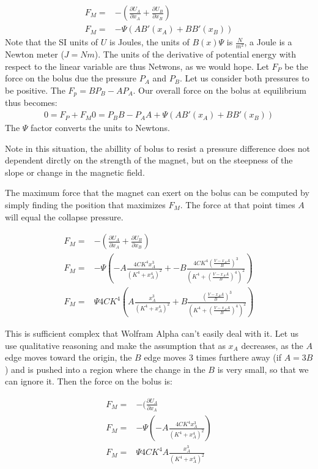 \documentclass{asme2ej}
\begin{document}
\begin{align}
  F_M = & - (\frac{\partial U_A}{\partial x_A} +  \frac{\partial U_B}{\partial x_B}) \\
  F_M =&  - \Psi ( A B'(x_A) + B B'(x_B))
  \label{eq:magforce}
\end{align}
Note that the SI units of $U$ is Joules, the units of $ B(x) \Psi$ is $\frac{N}{m^2}$,
a Joule is a Newton meter ($J = N m$).
The units of the derivative of potential energy with respect to the linear variable are
thus Netwons, as we would hope. Let $F_P$ be the force on the bolus due the pressure $P_A$ and $P_B$.
Let us consider both pressures to be positive. The $F_p = B P_B - A P_A$.
Our overall force on the bolus at equilibrium thus becomes:
\begin{align}
  0 = F_P + F_M
  0 = P_BB - P_AA +  \Psi ( A B'(x_A) + B B'(x_B))
\end{align}
The $\Psi$ factor converts the units to Newtons.

Note in this situation, the abillity of bolus to resist a pressure difference
does not dependent dirctly on the strength of the magnet, but on the
steepness of the slope or change in the magnetic field.

The maximum force that the magnet can exert on the bolus can
be computed by simply finding the position that maximizes $F_M$.
The force at that point times $A$ will equal the collapse pressure.

\begin{align}
  F_M = & - (\frac{\partial U_A}{\partial x_A} +  \frac{\partial U_B}{\partial x_B}) \\
  F_M =&  - \Psi ( - A \frac{4 C K^4 x_A^3}{(K^4 + x_A^4)^2} + - B \frac{4 C K^4 (\frac{V - x_AA}{B})^3}{(K^4 + (\frac{V - x_AA}{B})^4)^2}) \\
  F_M =&   \Psi 4 C K^4 (  A \frac{ x_A^3}{(K^4 + x_A^4)^2} +  B \frac{ (\frac{V - x_AA}{B})^3}{(K^4 + (\frac{V - x_AA}{B})^4)^2})
  \label{eq:magforce}
\end{align}

This is sufficient complex that Wolfram Alpha can't easily deal with it.
Let us use qualitative reasoning and make the assumption that as $x_A$ decreases,
as the $A$ edge moves toward the origin, the $B$ edge moves 3 times furthere
away (if $A = 3B$) and is pushed into a region where the change in the $B$
is very small, so that we can ignore it. Then the force on the bolus is:

\begin{align}
  F_M = & - (\frac{\partial U_A}{\partial x_A}  \\
  F_M =&  - \Psi ( - A \frac{4 C K^4 x_A^3}{(K^4 + x_A^4)^2}) \\
  F_M =&   \Psi 4 C K^4   A \frac{ x_A^3}{(K^4 + x_A^4)^2}
  \label{eq:magforce}
\end{align}
\end{document}
